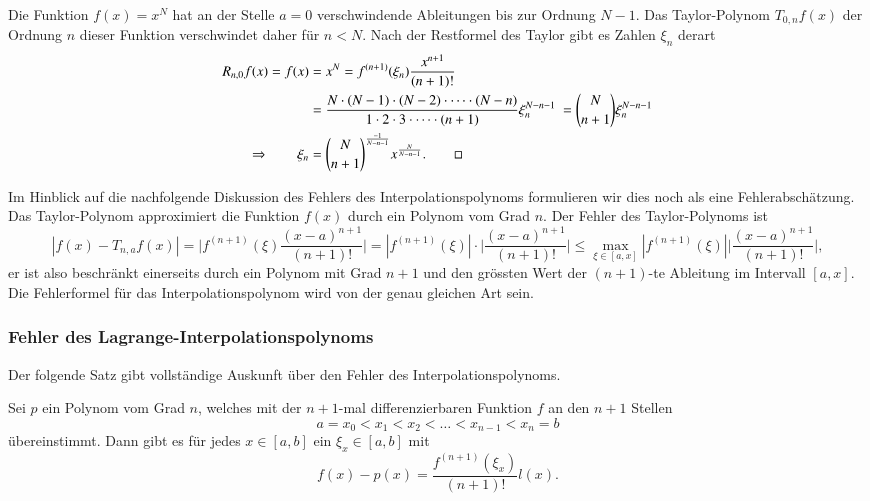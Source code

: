 \begin{beispiel}
Die Funktion $f(x)=x^N$ hat an der Stelle $a=0$ verschwindende
Ableitungen bis zur Ordnung $N-1$.
Das Taylor-Polynom $T_{0,n}f(x)$ der Ordnung $n$ dieser Funktion
verschwindet daher für $n<N$.
Nach der Restformel des Taylor gibt es Zahlen $\xi_n$ derart
\begin{align*}
R_{n,0}f(x)
=
f(x)
&=
x^N
= 
f^{(n+1)}(\xi_n) \frac{x^{n+1}}{(n+1)!}
\\
&=
\frac{
N\cdot(N-1)\cdot(N-2)\cdot\dots\cdot(N-n)
}{
1\cdot 2 \cdot 3 \cdot\dots \cdot (n+1)
}
\xi_n^{N-n-1} 
=
\binom{N}{n+1} \xi_n^{N-n-1}
\\
\Rightarrow\qquad
\xi_n
&=
\binom{N}{n+1}^{\frac{-1}{N-n-1}} x^{\frac{N}{N-n-1}}.
\qedhere
\end{align*}
\end{beispiel}

Im Hinblick auf die nachfolgende Diskussion des Fehlers des
Interpolationspolynoms formulieren wir dies noch als eine
Fehlerabschätzung.
Das Taylor-Polynom approximiert die Funktion $f(x)$ durch ein
Polynom vom Grad $n$.
Der Fehler des Taylor-Polynoms ist
\[
|f(x) - T_{n,a}f(x)|
=
\biggl|
f^{(n+1)}(\xi)
\frac{(x-a)^{n+1}}{(n+1)!}
\biggr|
=
|f^{(n+1)}(\xi)|\cdot
\biggl|
\frac{(x-a)^{n+1}}{(n+1)!}
\biggr|
\le
\max_{\xi\in [a,x]} |f^{(n+1)}(\xi)|
\biggl|
\frac{(x-a)^{n+1}}{(n+1)!}
\biggr|,
\]
er ist also beschränkt einerseits durch ein Polynom mit Grad $n+1$
und den grössten Wert der $(n+1)$-te Ableitung im Intervall $[a,x]$.
Die Fehlerformel für das Interpolationspolynom wird von der genau
gleichen Art sein.

\subsubsection{Fehler des Lagrange-Interpolationspolynoms}
Der folgende Satz gibt vollständige Auskunft über den Fehler des
Interpolationspolynoms.

\begin{satz}
\label{buch:satz:lagrangefehler}
Sei $p$ ein Polynom vom Grad $n$, welches mit der $n+1$-mal differenzierbaren
Funktion $f$ an den $n+1$ Stellen
\[
a = x_0 < x_1 < x_2 < \dots  < x_{n-1} < x_n=b
\]
übereinstimmt.
Dann gibt es für jedes $x\in[a,b]$ ein $\xi_x\in [a,b]$ mit
\begin{equation}
f(x) - p(x) = \frac{f^{(n+1)}(\xi_x)}{(n+1)!} l(x).
\label{buch:equation:polyfehler}
\end{equation}
\end{satz}

